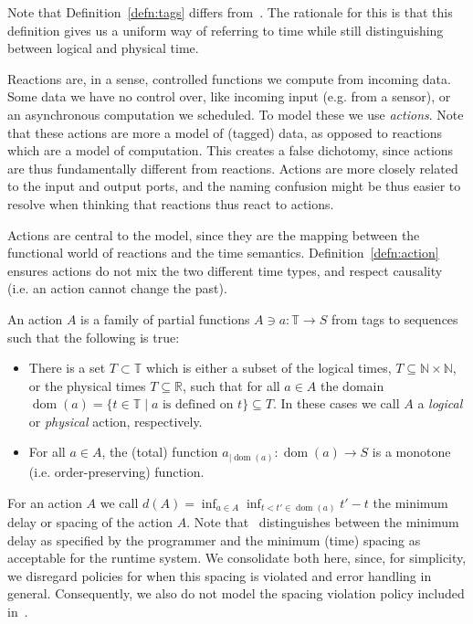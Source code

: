 \begin{defn}
\begin{defn}
Note that Definition~\ref{defn:tags} differs from~\cite{lohstroh_cyphy19,lohstroh_phdthesis}.
The rationale for this is that this definition gives us a uniform way of referring to time while still distinguishing between logical and physical time.

Reactions are, in a sense, controlled functions we compute from incoming data. 
Some data we have no control over, like incoming input (e.g. from a sensor), or an asynchronous computation we scheduled.
To model these we use \emph{actions}.
Note that these actions are more a model of (tagged) data, as opposed to reactions which are a model of computation.
This creates a false dichotomy, since actions are thus fundamentally different from reactions.
Actions are more closely related to the input and output ports, and the naming confusion might be thus easier to resolve when thinking that reactions thus react to actions.

Actions are central to the model, since they are the mapping between the functional world of reactions and the time semantics. 
Definition~\ref{defn:action} ensures actions do not mix the two different time types, and respect causality (i.e. an action cannot change the past).

\begin{defn}
    \label{defn:action}
An action $A$ is a family of partial functions $A \ni a : \mathbb{T} \rightarrow S$ from tags to sequences such that the following is true:
\begin{itemize}
    \item There is a set $T \subset \mathbb{T}$ which is either a subset of the logical times, $T \subseteq \mathbb{N} \times \mathbb{N}$, or the physical times $T \subseteq \mathbb{R}$, such that for all $a \in A$ the domain $\operatorname{dom}(a) = \{ t \in \mathbb{T} \mid a \text{ is defined on } t \} \subseteq T$.
    In these cases we call $A$ a \emph{logical} or \emph{physical} action, respectively.
    \item For all $a \in A$, the (total) function $a_{\big| \operatorname{dom}(a)}:\operatorname{dom}(a) \rightarrow S$ is a monotone (i.e. order-preserving) function.
\end{itemize}
\begin{defn}

For an action $A$ we call $d(A) = \operatorname{inf}_{a \in A} \operatorname{inf}_{t < t' \in \operatorname{dom}(a)} t' - t$ the minimum delay or spacing of the action $A$.
Note that~\cite{lohstroh_phdthesis} distinguishes between the minimum delay as specified by the programmer and the minimum (time) spacing as acceptable for the runtime system.
We consolidate both here, since, for simplicity, we disregard policies for when this spacing is violated and error handling in general.
Consequently, we also do not model the spacing violation policy included in~\cite{lohsroh_phdthesis}. 


\end{defn}
\end{defn}
\end{defn}
\end{defn}
